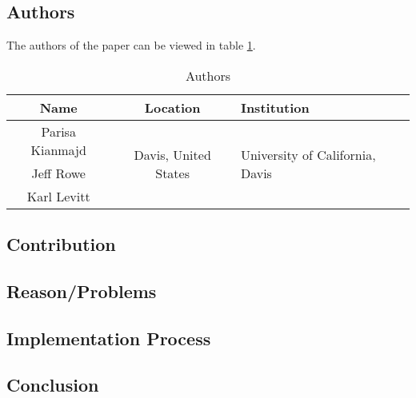 \clearpage
\section*{\citet{2016_Kianmajd}}

\subsection*{Authors}
The authors of the paper can be viewed in table \ref{tab:2016_Kianmajd_Authors}.
\begin{longtable}{ |c|c|p{5cm}| }
	\caption{Authors} \label{tab:2016_Kianmajd_Authors} \\
	\hline
 	\cellcolor{Gray}Name & \cellcolor{Gray}Location & \cellcolor{Gray}Institution \\ [0.5ex] 
 	\hline\hline
 	\endhead
	 Parisa Kianmajd &  \multirow{3}{*}{\centering Davis, United States} & \multirow{3}{*}{\parbox{5cm}{\centering University of California, Davis}} \\
	 \cline{1-1}
	 Jeff Rowe &  & \\
	 \cline{1-1}
	 Karl Levitt &  & \\
	\hline
\end{longtable}


\subsection*{Contribution}



\subsection*{Reason/Problems}



\subsection*{Implementation Process}


\subsection*{Conclusion}

